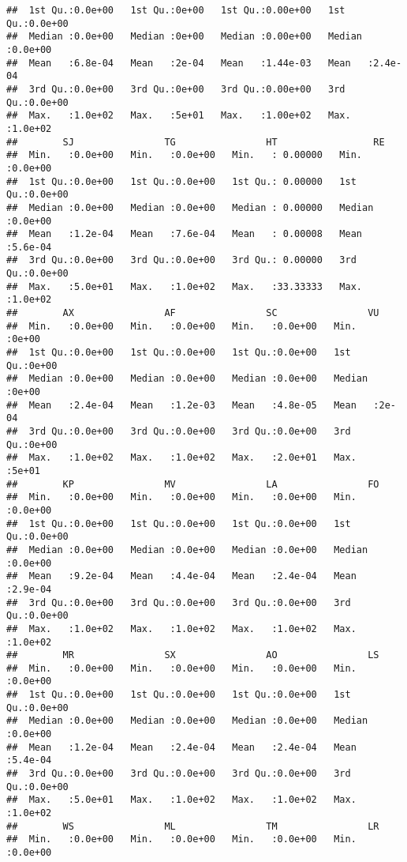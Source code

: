 \documentclass[
]{article}
\begin{document}
\begin{verbatim}
##  1st Qu.:0.0e+00   1st Qu.:0e+00   1st Qu.:0.00e+00   1st Qu.:0.0e+00  
##  Median :0.0e+00   Median :0e+00   Median :0.00e+00   Median :0.0e+00  
##  Mean   :6.8e-04   Mean   :2e-04   Mean   :1.44e-03   Mean   :2.4e-04  
##  3rd Qu.:0.0e+00   3rd Qu.:0e+00   3rd Qu.:0.00e+00   3rd Qu.:0.0e+00  
##  Max.   :1.0e+02   Max.   :5e+01   Max.   :1.00e+02   Max.   :1.0e+02  
##        SJ                TG                HT                 RE         
##  Min.   :0.0e+00   Min.   :0.0e+00   Min.   : 0.00000   Min.   :0.0e+00  
##  1st Qu.:0.0e+00   1st Qu.:0.0e+00   1st Qu.: 0.00000   1st Qu.:0.0e+00  
##  Median :0.0e+00   Median :0.0e+00   Median : 0.00000   Median :0.0e+00  
##  Mean   :1.2e-04   Mean   :7.6e-04   Mean   : 0.00008   Mean   :5.6e-04  
##  3rd Qu.:0.0e+00   3rd Qu.:0.0e+00   3rd Qu.: 0.00000   3rd Qu.:0.0e+00  
##  Max.   :5.0e+01   Max.   :1.0e+02   Max.   :33.33333   Max.   :1.0e+02  
##        AX                AF                SC                VU       
##  Min.   :0.0e+00   Min.   :0.0e+00   Min.   :0.0e+00   Min.   :0e+00  
##  1st Qu.:0.0e+00   1st Qu.:0.0e+00   1st Qu.:0.0e+00   1st Qu.:0e+00  
##  Median :0.0e+00   Median :0.0e+00   Median :0.0e+00   Median :0e+00  
##  Mean   :2.4e-04   Mean   :1.2e-03   Mean   :4.8e-05   Mean   :2e-04  
##  3rd Qu.:0.0e+00   3rd Qu.:0.0e+00   3rd Qu.:0.0e+00   3rd Qu.:0e+00  
##  Max.   :1.0e+02   Max.   :1.0e+02   Max.   :2.0e+01   Max.   :5e+01  
##        KP                MV                LA                FO         
##  Min.   :0.0e+00   Min.   :0.0e+00   Min.   :0.0e+00   Min.   :0.0e+00  
##  1st Qu.:0.0e+00   1st Qu.:0.0e+00   1st Qu.:0.0e+00   1st Qu.:0.0e+00  
##  Median :0.0e+00   Median :0.0e+00   Median :0.0e+00   Median :0.0e+00  
##  Mean   :9.2e-04   Mean   :4.4e-04   Mean   :2.4e-04   Mean   :2.9e-04  
##  3rd Qu.:0.0e+00   3rd Qu.:0.0e+00   3rd Qu.:0.0e+00   3rd Qu.:0.0e+00  
##  Max.   :1.0e+02   Max.   :1.0e+02   Max.   :1.0e+02   Max.   :1.0e+02  
##        MR                SX                AO                LS         
##  Min.   :0.0e+00   Min.   :0.0e+00   Min.   :0.0e+00   Min.   :0.0e+00  
##  1st Qu.:0.0e+00   1st Qu.:0.0e+00   1st Qu.:0.0e+00   1st Qu.:0.0e+00  
##  Median :0.0e+00   Median :0.0e+00   Median :0.0e+00   Median :0.0e+00  
##  Mean   :1.2e-04   Mean   :2.4e-04   Mean   :2.4e-04   Mean   :5.4e-04  
##  3rd Qu.:0.0e+00   3rd Qu.:0.0e+00   3rd Qu.:0.0e+00   3rd Qu.:0.0e+00  
##  Max.   :5.0e+01   Max.   :1.0e+02   Max.   :1.0e+02   Max.   :1.0e+02  
##        WS                ML                TM                LR         
##  Min.   :0.0e+00   Min.   :0.0e+00   Min.   :0.0e+00   Min.   :0.0e+00  

\end{verbatim}
\end{document}
